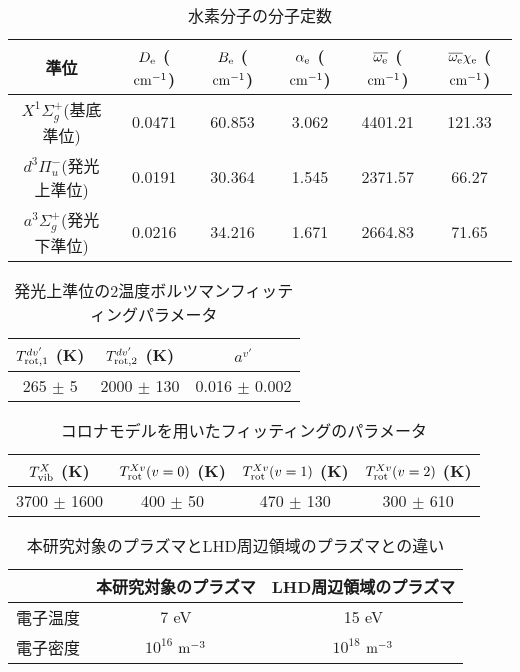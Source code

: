\listoftables
{}

\begin{table}
    \caption{水素分子の分子定数\cite{nist}}
    \label{table:molecular-constants}
    \centering
    \begin{tabular}{cccccc}
        \hline
        準位 & $D_{\rm e}$ ($\rm cm^{-1}$)& $B_{\rm e}$ ($\rm cm^{-1}$)& $\alpha_{\rm e}$ ($\rm cm^{-1}$)& $\overline{\omega_{\rm e}}$ ($\rm cm^{-1}$)& $\overline{\omega_{\rm e}} \chi_{\rm e}$ ($\rm cm^{-1}$)\\
        \hline
        $X^1 \Sigma^+_g$(基底準位) & 0.0471 & 60.853 & 3.062 & 4401.21 & 121.33\\
        $d^3 \Pi^-_u$(発光上準位) & 0.0191 & 30.364 & 1.545 & 2371.57 & 66.27\\
        $a^3 \Sigma^+_g$(発光下準位) & 0.0216 & 34.216 & 1.671 & 2664.83 & 71.65\\
        \hline
    \end{tabular}
\end{table}

\begin{table}
    \caption{発光上準位の2温度ボルツマンフィッティングパラメータ}
    \label{table:two-boltzmann-parameters}
    \centering
    \begin{tabular}{ccc}
        \hline
        $T^{dv'}_{\rm rot,1}$ (K) & $T^{dv'}_{\rm rot,2}$ (K) & $a^{v'}$ \\
        \hline
        265 $\pm$ 5 & 2000 $\pm$ 130 & 0.016 $\pm$ 0.002\\
        \hline
    \end{tabular}
\end{table}

\begin{table}
    \caption{コロナモデルを用いたフィッティングのパラメータ}
    \label{table:fitting-result}
    \centering
    \begin{tabular}{cccc}
        \hline
        $T^{X}_{\rm vib}$ (K) & $T^{Xv}_{\rm rot}(v=0)$ (K) & $T^{Xv}_{\rm rot}(v=1)$ (K) & $T^{Xv}_{\rm rot}(v=2)$ (K)\\
        \hline
        3700 $\pm$ 1600 & 400 $\pm$ 50 & 470 $\pm$ 130 & 300 $\pm$ 610\\
        \hline
    \end{tabular}
\end{table}

\begin{table}
    \caption{本研究対象のプラズマとLHD周辺領域のプラズマ\cite{ishihara}との違い}
    \label{table:LHD-and-this-plasma}
    \centering
    \begin{tabular}{ccc}
        \hline
         & 本研究対象のプラズマ & LHD周辺領域のプラズマ\\
        \hline
        電子温度 & 7 eV & 15 eV\\
        電子密度 & $10^{16}$ $\rm m^{-3}$ & $10^{18}$ $\rm m^{-3}$\\
        \hline
    \end{tabular}
\end{table}

